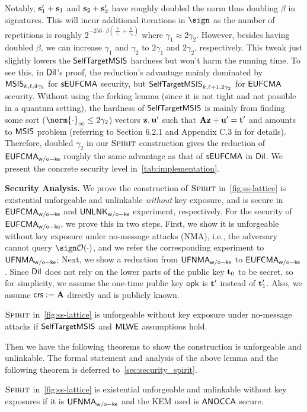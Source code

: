 Notably, $\mathbf{s}'_1+\mathbf{s}_1$ and $\mathbf{s}_2+\mathbf{s}'_2$ have roughly doubled the norm thus doubling $\beta$ in signatures. This will incur additional iterations in $\sign$ as the number of repetitions is roughly $2^{-256\cdot \beta(\frac{\ell}{\gamma_1}+\frac{k}{\gamma_2})}$ where $\gamma_1\approx 2\gamma_2$\cite{NISTPQC-R3:CRYSTALS-DILITHIUM20}.
However, besides having doubled $\beta$, we can increase $\gamma_1$ and $\gamma_2$ to $2\gamma_1$ and $2\gamma_2$, respectively. This tweak just slightly lowers the $\mathsf{SelfTargetMSIS}$ hardness but won't harm the running time. To see this, in $\mathsf{Dil}$'s proof, the reduction's advantage mainly dominated by $\mathsf{MSIS}_{k,\ell,4\gamma_2}$ for $\mathsf{sEUFCMA}$ security, but $\mathsf{SelfTargetMSIS}_{k,\ell+1,2\gamma_2}$ for $\mathsf{EUFCMA}$ security. Without using the forking lemma (since it is not tight and not possible in a quantum setting), the hardness of $\mathsf{SelfTargetMSIS}$ is mainly from finding some sort ($\norm{\cdot}_\infty\le 2\gamma_2$) vectors $\mathbf{z},\mathbf{u}'$ such that $\mathbf{A}\mathbf{z}+\mathbf{u}'=\mathbf{t}'$ and amounts to $\mathsf{MSIS}$ problem (referring to Section 6.2.1 and Appendix C.3 in \cite{NISTPQC-R3:CRYSTALS-DILITHIUM20} for details).
Therefore, doubled $\gamma_2$ in our $\textsc{Spirit}$ construction gives the reduction of $\mathsf{EUFCMA}_\mathsf{w/o-ke}$ roughly the same advantage as that of $\mathsf{sEUFCMA}$ in $\mathsf{Dil}$. We present the concrete security level in~\cref{tab:implementation}.


\smallskip\noindent\textbf{Security Analysis.}
We prove the construction of $\textsc{Spirit}$ in~\cref{fig:ss-lattice} is existential unforgeable and unlinkable \emph{without} key exposure, and is secure in $\mathsf{EUFCMA}_\mathsf{w/o-ke}$ and $\mathsf{UNLNK}_\mathsf{w/o-ke}$ experiment, respectively.
For the security of $\mathsf{EUFCMA}_\mathsf{w/o-ke}$, we prove this in two steps. First, we show it is unforgeable without key exposure under no-message attacks (NMA), i.e., the adversary cannot query $\sign\Oc(\cdot)$, and we refer the corresponding experiment to $\mathsf{UFNMA}_\mathsf{w/o-ke}$; Next, we show a reduction from $\mathsf{UFNMA}_\mathsf{w/o-ke}$ to $\mathsf{EUFCMA}_\mathsf{w/o-ke}$. Since $\mathsf{Dil}$ does not rely on the lower parts of the public key $\mathbf{t}_0$ to be secret, so for simplicity, we assume the one-time public key $\mathsf{opk}$ is $\mathbf{t}'$ instead of $\mathbf{t}'_1$. Also, we assume $\mathsf{crs}:=\mathbf{A}$ directly and is publicly known.

\begin{lemma}[informal]
\label{lem:ufnmawoke-abs}
$\textsc{Spirit}$ in~\cref{fig:ss-lattice} is unforgeable without key exposure under no-message attacks if $\mathsf{SelfTargetMSIS}$ and $\mathsf{MLWE}$ assumptions hold.
\end{lemma}


Then we have the following theorems to show the construction is unforgeable and unlinkable. The formal statement and analysis of the above lemma and the following theorem is deferred to~\cref{sec:security_spirit}.
\begin{theorem}[informal]
\label{thm:ss-woke-abs}
$\textsc{Spirit}$ in~\cref{fig:ss-lattice} is existential unforgeable and unlinkable without key exposures if it is $\mathsf{UFNMA}_\mathsf{w/o-ke}$ and the KEM used is $\mathsf{ANOCCA}$ secure.
\end{theorem}


